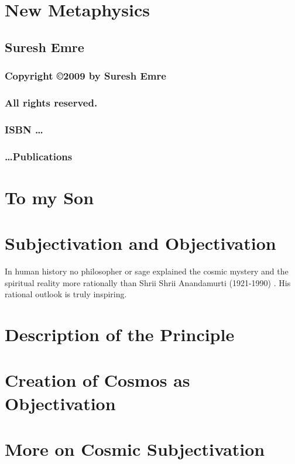\documentclass[12pt]{book}
\begin{document}
\frontmatter
\chapter*{\Huge \center New Metaphysics }
\thispagestyle{empty}
\section*{\huge \center Suresh Emre}
\newpage
\subsection*{\center \normalsize Copyright \copyright 2009 by Suresh Emre}
\subsection*{\center \normalsize All rights reserved.}
\subsection*{\center \normalsize ISBN \dots}
\subsection*{\center \normalsize \dots Publications}
\chapter*{\center \normalsize To my Son}
%
\mainmatter
%
\chapter*{Subjectivation and Objectivation}
In human history no philosopher or sage explained the cosmic mystery and the spiritual reality more rationally than Shrii Shrii Anandamurti (1921-1990) \cite{baba_books} \cite{anandamitra}. His rational outlook is truly inspiring.
\chapter*{Description of the Principle}
\chapter*{Creation of Cosmos as Objectivation}
\chapter*{More on Cosmic Subjectivation}
\end{document}
